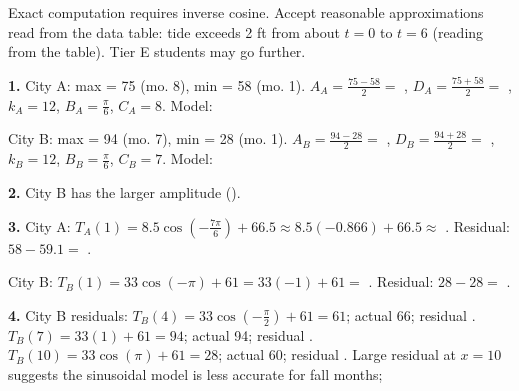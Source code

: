 \documentclass[10pt]{article}
\begin{document}
\begin{tcolorbox}[colback=white, colframe=black!40,
    title=\textbf{Tier A --- Apply (Key)},
    fonttitle=\bfseries, arc=2mm, left=3mm, right=3mm, top=2mm, bottom=2mm]
\begin{teachernote}
Exact computation requires inverse cosine. Accept reasonable approximations read from the data table: tide exceeds 2 ft from about $t = 0$ to $t = 6$ (reading from the table). Tier E students may go further.
\end{teachernote}

\end{tcolorbox}

\vspace{0.08in}

\begin{tcolorbox}[colback=white, colframe=black!40,
    title=\textbf{Tier E --- Extend (Key)},
    fonttitle=\bfseries, arc=2mm, left=3mm, right=3mm, top=2mm, bottom=2mm]

\textbf{1.} City A: max = 75 (mo. 8), min = 58 (mo. 1).
$A_A = \tfrac{75-58}{2} = $ ,
$D_A = \tfrac{75+58}{2} = $ ,
$k_A = 12$, $B_A = \tfrac{\pi}{6}$, $C_A = 8$.
Model: 

City B: max = 94 (mo. 7), min = 28 (mo. 1).
$A_B = \tfrac{94-28}{2} = $ ,
$D_B = \tfrac{94+28}{2} = $ ,
$k_B = 12$, $B_B = \tfrac{\pi}{6}$, $C_B = 7$.
Model: 

\vspace{4pt}
\textbf{2.} City B has the larger amplitude ().

\vspace{4pt}
\textbf{3.} City A: $T_A(1) = 8.5\cos\!\left(-\tfrac{7\pi}{6}\right)+66.5 \approx 8.5(-0.866)+66.5 \approx $ . Residual: $58 - 59.1 = $ .

City B: $T_B(1) = 33\cos\!\left(-\pi\right)+61 = 33(-1)+61 = $ . Residual: $28 - 28 = $ .

\vspace{4pt}
\textbf{4.} City B residuals: $T_B(4) = 33\cos\!\left(-\tfrac{\pi}{2}\right)+61 = 61$; actual 66; residual . $T_B(7) = 33(1)+61 = 94$; actual 94; residual . $T_B(10) = 33\cos\!\left(\pi\right)+61 = 28$; actual 60; residual . Large residual at $x=10$ suggests the sinusoidal model is less accurate for fall months; 


\end{tcolorbox}
\end{document}
